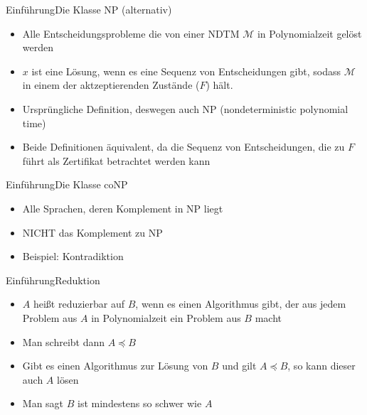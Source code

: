 \documentclass[ignorenonframetext,]{beamer}
\begin{document}
\begin{frame}{Einführung}{Die Klasse NP (alternativ)}

\begin{itemize}
\itemsep1pt\parskip0pt
\item
  Alle Entscheidungsprobleme die von einer NDTM $\mathcal{M}$ in
  Polynomialzeit gelöst werden
\item
  $x$ ist eine Lösung, wenn es eine Sequenz von Entscheidungen gibt,
  sodass $\mathcal{M}$ in einem der aktzeptierenden Zustände ($F$) hält.

\item
  Ursprüngliche Definition, deswegen auch NP (nondeterministic
  polynomial time)
\item
  Beide Definitionen äquivalent, da die Sequenz von Entscheidungen, die
  zu $F$ führt als Zertifikat betrachtet werden kann
\end{itemize}

\end{frame}

\begin{frame}{Einführung}{Die Klasse coNP}

\begin{itemize}
\itemsep1pt\parskip0pt
\item
  Alle Sprachen, deren Komplement in NP liegt
\item
  NICHT das Komplement zu NP
\item
  Beispiel: Kontradiktion
\end{itemize}

\end{frame}

\begin{frame}{Einführung}{Reduktion}

\begin{itemize}
\itemsep1pt\parskip0pt
\item
  $A$ heißt reduzierbar auf $B$, wenn es einen Algorithmus gibt, der aus
  jedem Problem aus $A$ in Polynomialzeit ein Problem aus $B$ macht
\item
  Man schreibt dann $A \preceq B$
\item
  Gibt es einen Algorithmus zur Lösung von $B$ und gilt $A \preceq B$,
  so kann dieser auch $A$ lösen
\item
  Man sagt $B$ ist mindestens so schwer wie $A$
\end{itemize}

\end{frame}
\end{document}
